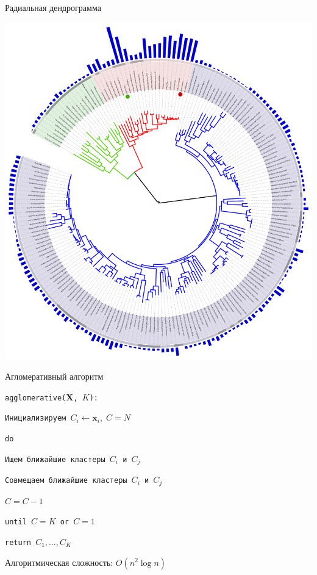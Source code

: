 \documentclass[10pt,a4paper]{beamer}
\begin{document}

\begin{frame}{Радиальная дендрограмма}

\begin{center}
\includegraphics[scale=0.3]{images/radial.png}
\end{center}

\end{frame}


\begin{frame}{Агломеративный алгоритм}

\texttt{agglomerative($\mathbf{X}$, $K$):}

\texttt{\quad Инициализируем $C_i \leftarrow \mathbf{x}_i,\; C = N$}

\texttt{\quad do}

\texttt{\quad\quad Ищем ближайшие кластеры $C_i$ и $C_j$}

\texttt{\quad\quad Совмещаем ближайшие кластеры $C_i$ и $C_j$}

\texttt{\quad\quad $C = C - 1$}

\texttt{\quad until $C = K$ or $C = 1$}

\texttt{\quad return $C_1, \ldots, C_K$}

\vspace{1em}
Алгоритмическая сложность: $O(n^2 \log n)$

\end{frame}
\end{document}
